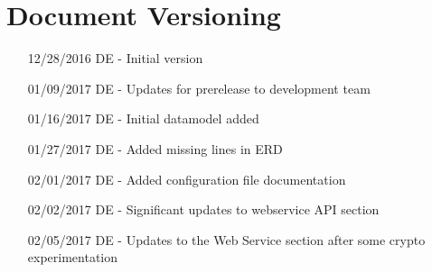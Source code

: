 \chapter*{Document Versioning}
\begin{enumerate}
    \item[12/28/2016] DE - Initial version
    \item[01/09/2017] DE - Updates for prerelease to development team
    \item[01/16/2017] DE - Initial datamodel added
    \item[01/27/2017] DE - Added missing lines in ERD
    \item[02/01/2017] DE - Added configuration file documentation
    \item[02/02/2017] DE - Significant updates to webservice API section
    \item[02/05/2017] DE - Updates to the Web Service section after some crypto experimentation
\end{enumerate}
